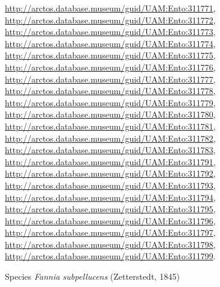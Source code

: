 \documentclass[9pt, article]{memoir}
\begin{document}
\begin{multicols}{2}
\url{http://arctos.database.museum/guid/UAM:Ento:311771}, 
\url{http://arctos.database.museum/guid/UAM:Ento:311772}, 
\url{http://arctos.database.museum/guid/UAM:Ento:311773}, 
\url{http://arctos.database.museum/guid/UAM:Ento:311774}, 
\url{http://arctos.database.museum/guid/UAM:Ento:311775}, 
\url{http://arctos.database.museum/guid/UAM:Ento:311776}, 
\url{http://arctos.database.museum/guid/UAM:Ento:311777}, 
\url{http://arctos.database.museum/guid/UAM:Ento:311778}, 
\url{http://arctos.database.museum/guid/UAM:Ento:311779}, 
\url{http://arctos.database.museum/guid/UAM:Ento:311780}, 
\url{http://arctos.database.museum/guid/UAM:Ento:311781}, 
\url{http://arctos.database.museum/guid/UAM:Ento:311782}, 
\url{http://arctos.database.museum/guid/UAM:Ento:311783}, 
\url{http://arctos.database.museum/guid/UAM:Ento:311791}, 
\url{http://arctos.database.museum/guid/UAM:Ento:311792}, 
\url{http://arctos.database.museum/guid/UAM:Ento:311793}, 
\url{http://arctos.database.museum/guid/UAM:Ento:311794}, 
\url{http://arctos.database.museum/guid/UAM:Ento:311795}, 
\url{http://arctos.database.museum/guid/UAM:Ento:311796}, 
\url{http://arctos.database.museum/guid/UAM:Ento:311797}, 
\url{http://arctos.database.museum/guid/UAM:Ento:311798}, 
\url{http://arctos.database.museum/guid/UAM:Ento:311799}.

\vspace{6pt}\noindent\hspace{36pt}Species \textit{Fannia subpellucens} (Zetterstedt, 1845)



\end{multicols}
\end{document}
